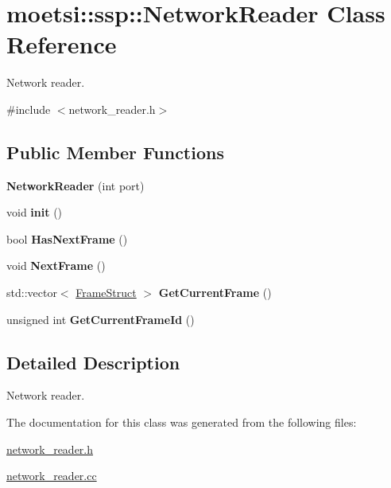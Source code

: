 \hypertarget{classmoetsi_1_1ssp_1_1NetworkReader}{}\section{moetsi\+:\+:ssp\+:\+:Network\+Reader Class Reference}
\label{classmoetsi_1_1ssp_1_1NetworkReader}


Network reader.  




{\ttfamily \#include $<$network\+\_\+reader.\+h$>$}

\subsection*{Public Member Functions}
\begin{DoxyCompactItemize}
\item 
\mbox{\label{classmoetsi_1_1ssp_1_1NetworkReader_a9bdd3780ddd272cfcbc906d720e86c83}} 
{\bfseries Network\+Reader} (int port)
\item 
\mbox{\label{classmoetsi_1_1ssp_1_1NetworkReader_adfb4188f382d0659d49ff1cecdc5300c}} 
void {\bfseries init} ()
\item 
\mbox{\label{classmoetsi_1_1ssp_1_1NetworkReader_aa13257b597a09567e0c05b076377df71}} 
bool {\bfseries Has\+Next\+Frame} ()
\item 
\mbox{\label{classmoetsi_1_1ssp_1_1NetworkReader_a874a26e90dc4be7d65e69bdb6f8756c1}} 
void {\bfseries Next\+Frame} ()
\item 
\mbox{\label{classmoetsi_1_1ssp_1_1NetworkReader_aba016077f99da855240a9b181c9ee2d6}} 
std\+::vector$<$ \hyperlink{structmoetsi_1_1ssp_1_1FrameStruct}{Frame\+Struct} $>$ {\bfseries Get\+Current\+Frame} ()
\item 
\mbox{\label{classmoetsi_1_1ssp_1_1NetworkReader_a165115474912210dfbf05dc11f0222bd}} 
unsigned int {\bfseries Get\+Current\+Frame\+Id} ()
\end{DoxyCompactItemize}


\subsection{Detailed Description}
Network reader. 

The documentation for this class was generated from the following files\+:\begin{DoxyCompactItemize}
\item 
\hyperlink{network__reader_8h}{network\+\_\+reader.\+h}\item 
\hyperlink{network__reader_8cc}{network\+\_\+reader.\+cc}\end{DoxyCompactItemize}
